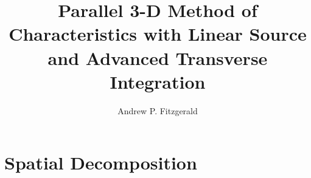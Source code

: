 \documentclass[thesis]{thesis-umich}
\title{Parallel 3-D Method of Characteristics with Linear Source and Advanced Transverse Integration}
\author{Andrew P. Fitzgerald}
\begin{document}
    \acresetall

    
    
    
    
    
    \printbibliography
    \appendix
        \chapter{Spatial Decomposition}{\label{ch:Spatial Decomposition in MPACT}
            
        }
\end{document}
